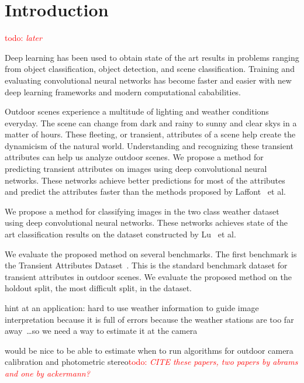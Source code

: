 \documentclass{article}
\newcommand{\todo}[1]{\textcolor{red}{todo: {\em #1}}}
\begin{document}
\section{Introduction}

\todo{later}

Deep learning has been used to obtain state of the art results in
problems ranging from object classification, object detection, and
scene classification.  Training and evaluating convolutional neural
networks has become faster and easier with new deep learning
frameworks and modern computational cababilities.  

Outdoor scenes experience a multitude of lighting and weather conditions
everyday.  The scene can change from dark and rainy to sunny and clear 
skys in a matter of hours.  These fleeting, or transient, attributes of
a scene help create the dynamicism of the natural world.  Understanding 
and recognizing these transient attributes can help us analyze outdoor
scenes. We propose a method for predicting transient attributes on images 
using deep convolutional neural networks.  These networks achieve better 
predictions for most of the attributes and predict the attributes
faster than the methods proposed by Laffont~\cite{Laffont14} et al.

We propose a method for classifying images in the two class weather 
dataset using deep convolutional neural networks.  These networks 
achieves state of the art classification results on the dataset
constructed by Lu~\cite{lutwoclass} et al.

We evaluate the proposed method on several benchmarks.  The first 
benchmark is the Transient Attributes Dataset~\cite{Laffont14}.  This 
is the standard benchmark dataset for transient attributes in outdoor
scenes.  We evaluate the proposed method on the holdout split, the 
most difficult split, in the dataset.  

hint at an application: hard to use weather information to guide image
interpretation because it is full of errors because the weather
stations are too far away~\cite{islam13webcamweather}\dots so we need
a way to estimate it at the camera

would be nice to be able to estimate when to run algorithms for
outdoor camera
calibration\cite{jacobs13cloudcalibration,workman2014rainbow} and
photometric stereo\todo{CITE these papers, two papers by abrams and
one by ackermann?}
\end{document}
